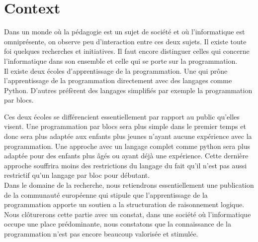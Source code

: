 \section{Context}
\label{intro-context}
Dans un monde où la pédagogie est un sujet de société et où l'informatique est omniprésente, on observe peu d'interaction entre ces deux sujets. Il existe toute foi quelques recherches et initiatives. Il faut encore distinguer celles qui concerne l'informatique dans son ensemble et celle qui se porte sur la programmation.\\

Il existe deux écoles d'apprentissage de la programmation. Une qui prône l'apprentissage de la programmation directement avec des langages comme Python. D'autres préfèrent des langages simplifiés par exemple la programmation par blocs. 

Ces deux écoles se différencient essentiellement par rapport au public qu'elles visent. Une programmation par blocs sera plus simple dans le premier temps et donc sera plus adaptée aux enfants plus jeunes n'ayant aucune expérience avec la programmation. Une approche avec un langage complet comme python sera plus adaptée pour des enfants plus âgés ou ayant déjà une expérience. Cette dernière approche souffrira moins des restrictions du langage du fait qu'il n'est pas aussi restrictif qu'un langage par bloc pour débutant.\\

Dans le domaine de la recherche, nous retiendrons essentiellement une publication de la communauté européenne qui stipule que l'apprentissage de la programmation apporte un soutien a la structuration de raisonnement logique.\\

Nous clôturerons cette partie avec un constat, dans une société où l'informatique occupe une place prédominante, nous constatons que la connaissance de la programmation n'est pas encore beaucoup valorisée et stimulée. 
